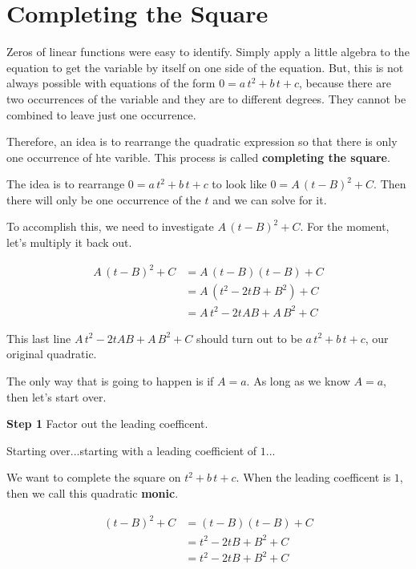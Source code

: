 \documentclass{ximera}
\begin{document}
\section{Completing the Square}

Zeros of linear functions were easy to identify.  Simply apply a little algebra to the equation to get the variable by itself on one side of the equation.  But, this is not always possible with equations of the form $0 = a \, t^2 + b \, t + c $, because there are two occurrences of the variable and they are to different degrees. They cannot be combined to leave just one occurrence.

Therefore, an idea is to rearrange the quadratic expression so that there is only one occurrence of hte varible.  This process is called \textbf{completing the square}.

The idea is to rearrange  $0 = a \, t^2 + b \, t + c$ to look like $0 = A \, (t-B)^2 + C$.  Then there will only be  one occurrence of the $t$ and we can solve for it.


To accomplish this, we need to investigate $A \, (t-B)^2 + C$. For the moment, let's multiply it back out.


\begin{align*}
A \, (t-B)^2 + C & = A \, (t-B)(t-B) + C \\
& = A \, (t^2 - 2 t B + B^2) + C  \\
& = A \, t^2 - 2 t A B + A \, B^2 + C
\end{align*}

This last line $A \, t^2 - 2 t A B + A \, B^2 + C$ should turn out to be $a \, t^2 + b \, t + c$, our original quadratic.

The only way that is going to happen is if $A = a$. As long as we know $A = a$, then let's start over.

\textbf{Step 1}  Factor out the leading coefficent.


Starting over...starting with a leading coefficient of $1$...



We want to complete the square on $t^2 + b \, t + c$.  When the leading coefficent is $1$, then we call this quadratic \textbf{monic}.



\begin{align*}
(t-B)^2 + C & = (t-B)(t-B) + C \\
& = t^2 - 2 t B + B^2 + C  \\
& = t^2 - 2 t B +  B^2 + C
\end{align*}
\end{document}
